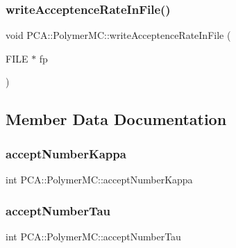 \subsubsection{\texorpdfstring{write\+Acceptence\+Rate\+In\+File()}{writeAcceptenceRateInFile()}}
{\footnotesize\ttfamily void P\+C\+A\+::\+Polymer\+M\+C\+::write\+Acceptence\+Rate\+In\+File (\begin{DoxyParamCaption}\item[{F\+I\+LE $\ast$}]{fp }\end{DoxyParamCaption})\hspace{0.3cm}{\ttfamily [inline]}}



\subsection{Member Data Documentation}
\hypertarget{class_p_c_a_1_1_polymer_m_c_adc7d93c4f0f568dd5fd9b74064e0cd88}{}\label{class_p_c_a_1_1_polymer_m_c_adc7d93c4f0f568dd5fd9b74064e0cd88} 
\subsubsection{\texorpdfstring{accept\+Number\+Kappa}{acceptNumberKappa}}
{\footnotesize\ttfamily int P\+C\+A\+::\+Polymer\+M\+C\+::accept\+Number\+Kappa\hspace{0.3cm}{\ttfamily [private]}}

\hypertarget{class_p_c_a_1_1_polymer_m_c_a537709e4e856390abc7f511de2cf4c58}{}\label{class_p_c_a_1_1_polymer_m_c_a537709e4e856390abc7f511de2cf4c58} 
\subsubsection{\texorpdfstring{accept\+Number\+Tau}{acceptNumberTau}}
{\footnotesize\ttfamily int P\+C\+A\+::\+Polymer\+M\+C\+::accept\+Number\+Tau\hspace{0.3cm}{\ttfamily [private]}}

\hypertarget{class_p_c_a_1_1_polymer_m_c_a69019643d3a1fd92b8c77647bb4a91d6}{}\label{class_p_c_a_1_1_polymer_m_c_a69019643d3a1fd92b8c77647bb4a91d6} 
